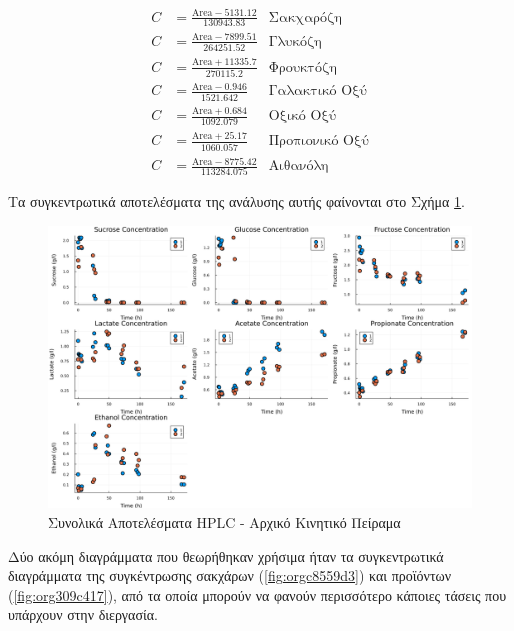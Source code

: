 \documentclass[11pt]{report}
\begin{document}
\begin{enumerate}
\begin{subequations}
\label{eqn:hplc-calibration}
\begin{align}
C &= \frac{\text{Area} - 5131.12}{130943.83} & \text{Σακχαρόζη} \label{eqn:hplc-sucrose} \\
C &= \frac{\text{Area} - 7899.51}{264251.52} & \text{Γλυκόζη} \label{eqn:hplc-glucose} \\
C &= \frac{\text{Area} + 11335.7}{270115.2} & \text{Φρουκτόζη} \label{eqn:hplc-fructose} \\
C &= \frac{\text{Area} - 0.946}{1521.642} & \text{Γαλακτικό Οξύ} \label{eqn:hplc-lactate} \\
C &= \frac{\text{Area} + 0.684}{1092.079} & \text{Οξικό Οξύ} \label{eqn:hplc-acetate} \\
C &= \frac{\text{Area} + 25.17}{1060.057} & \text{Προπιονικό Οξύ} \label{eqn:hplc-propionate} \\
C &= \frac{\text{Area} - 8775.42}{113284.075} & \text{Αιθανόλη} \label{eqn:hplc-ethanol}
\end{align}
\end{subequations}

Τα συγκεντρωτικά αποτελέσματα της ανάλυσης αυτής φαίνονται στο Σχήμα \ref{fig:org031a139}. 

\begin{figure}[htbp]
\centering
\includegraphics[width=.9\linewidth]{../plots/23_10/final_scatter_23_10.png}
\caption{\label{fig:org031a139}Συνολικά Αποτελέσματα HPLC - Αρχικό Κινητικό Πείραμα}
\end{figure}

Δύο ακόμη διαγράμματα που θεωρήθηκαν χρήσιμα ήταν τα συγκεντρωτικά διαγράμματα της συγκέντρωσης σακχάρων (\ref{fig:orgc8559d3}) και προϊόντων (\ref{fig:org309c417}), από τα οποία μπορούν να φανούν περισσότερο κάποιες τάσεις που υπάρχουν στην διεργασία.


\end{enumerate}
\end{document}

